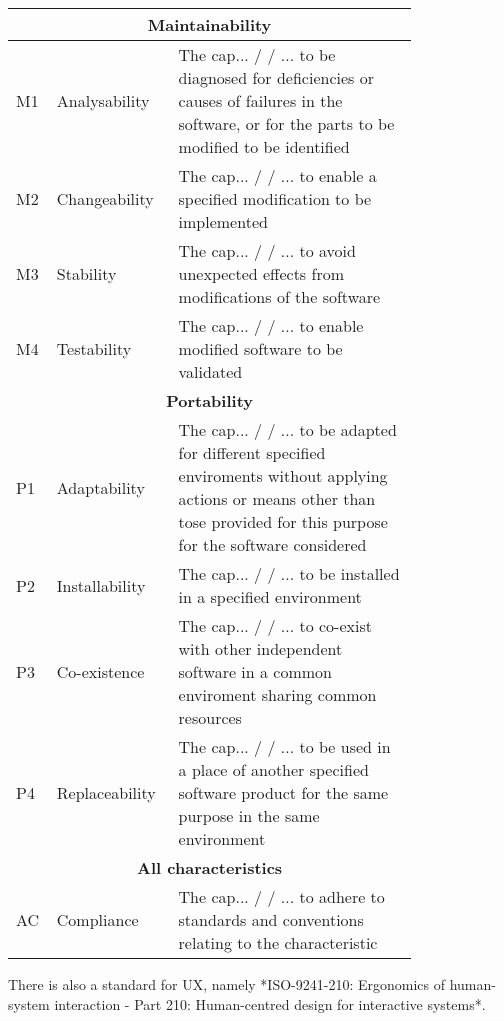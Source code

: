 \documentclass[11pt]{article}
\begin{document}
\begin{multicols}{2}
    \begin{table}[]
        \centering
        \begin{tabular}{|p{0.05\linewidth}|p{0.2\linewidth}|p{0.55\linewidth}|}
            \hline
            \multicolumn{3}{c}{\textbf{Maintainability}} \\ \hline
            M1&Analysability & The cap... / / ... to be diagnosed for deficiencies or causes of failures in the
            software, or for the parts to be modified to be identified \\ \hline
            M2&Changeability & The cap... / / ... to enable a specified modification to be implemented \\ \hline
            M3&Stability & The cap... / / ... to avoid unexpected effects from modifications of the software \\ \hline
            M4&Testability &The cap... / / ... to enable modified software to be validated \\ \hline
            
            \multicolumn{3}{c}{\textbf{Portability}} \\ \hline
            P1& Adaptability &The cap... / / ... to be adapted for different specified enviroments without applying
            actions or means other than tose provided for this purpose for the software considered \\ \hline
            P2&Installability& The cap... / / ... to be installed in a specified environment \\ \hline
            P3&Co-existence &The cap... / / ... to co-exist with other independent software in a common enviroment sharing
            common resources \\ \hline
            P4&Replaceability &The cap... / / ... to be used in a place of another specified software product for the same
            purpose in the same environment \\ \hline

            \multicolumn{3}{c}{\textbf{All characteristics}} \\ \hline
            AC&Compliance & The cap... / / ... to adhere to standards and conventions relating to the
            characteristic \\ \hline
        \end{tabular}
    \end{table}





        There is also a standard for UX,
        namely *ISO-9241-210: Ergonomics of human-system interaction -
        Part 210: Human-centred design for interactive systems*.


\end{multicols}
\end{document}
